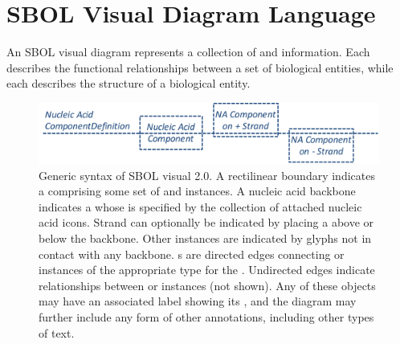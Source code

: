 \section{SBOL Visual Diagram Language}
\label{sec:language}

An SBOL visual diagram represents a collection of  and  information.  
Each  describes the functional relationships between a set of biological entities,
while each  describes the structure of a biological entity.  

\begin{figure}[h!]
\centering
\includegraphics[width=6in]{figures/SBOLsyntax.pdf}
\caption{Generic syntax of SBOL visual 2.0. A rectilinear boundary indicates a  comprising some set of  and  instances.
A nucleic acid backbone indicates a  whose  is specified by the collection of attached nucleic acid  icons.  
Strand can optionally be indicated by placing a  above or below the backbone.  
Other  instances are indicated by glyphs not in contact with any backbone.
s are directed edges connecting  or  instances of the appropriate type for the .  Undirected edges indicate  relationships between  or  instances (not shown).
Any of these objects may have an associated label showing its , and the diagram may further include any form of other annotations, including other types of text.}
\label{f:syntax}
\end{figure}


